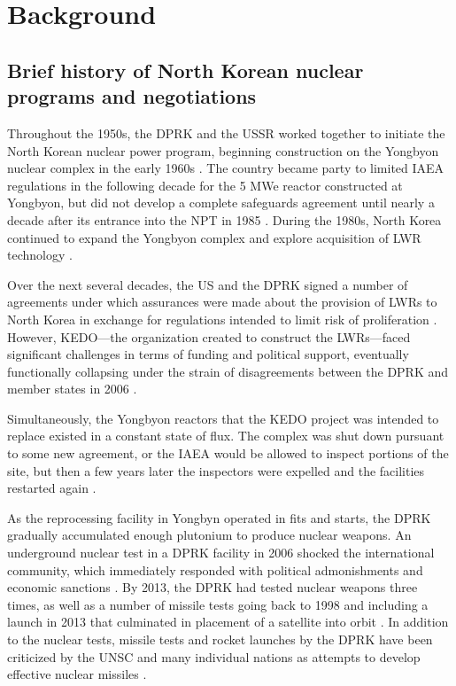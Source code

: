 \chapter{Background}

\section{Brief history of North Korean nuclear programs and negotiations}

Throughout the 1950s, the DPRK and the USSR worked together to initiate the North Korean nuclear power program, beginning construction on the Yongbyon nuclear complex in the early 1960s \cite{nti15}. The country became party to limited IAEA regulations in the following decade for the 5 MWe reactor constructed at Yongbyon, but did not develop a complete safeguards agreement until nearly a decade after its entrance into the NPT in 1985 \cite{iaea09}. During the 1980s, North Korea continued to expand the Yongbyon complex and explore acquisition of LWR technology \cite{ntiYongbyon}.

Over the next several decades, the US and the DPRK signed a number of agreements under which assurances were made about the provision of LWRs to North Korea in exchange for regulations intended to limit risk of proliferation \cite{agreed, davenport}. However, KEDO---the organization created to construct the LWRs---faced significant challenges in terms of funding and political support, eventually functionally collapsing under the strain of disagreements between the DPRK and member states in 2006 \cite{kedohist}.


Simultaneously, the Yongbyon reactors that the KEDO project was intended to replace existed in a constant state of flux. The complex was shut down pursuant to some new agreement, or the IAEA would be allowed to inspect portions of the site, but then a few years later the inspectors were expelled and the facilities restarted again \cite{davenport,nti15,iaea09}.

As the reprocessing facility in Yongbyn operated in fits and starts, the DPRK gradually accumulated enough plutonium to produce nuclear weapons. An underground nuclear test in a DPRK facility in 2006 shocked the international community, which immediately responded with political admonishments and economic sanctions \cite{davenport}. By 2013, the DPRK had tested nuclear weapons three times, as well as a number of missile tests going back to 1998 \cite{orfall} and including a launch in 2013 that culminated in placement of a satellite into orbit \cite{davenport}. In addition to the nuclear tests, missile tests and rocket launches by the DPRK have been criticized by the UNSC and many individual nations as attempts to develop effective nuclear missiles \cite{unApr12}.


